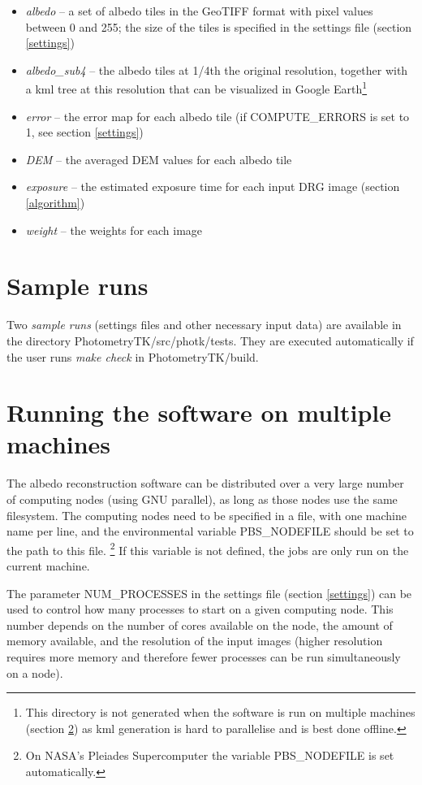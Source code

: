 \documentclass[letterpaper,fleqn,11pt]{report}
\begin{document}
\begin{itemize}
\item {\it albedo} --  a set of albedo tiles in the GeoTIFF format with pixel values between 0 and 255; the size of the tiles is specified in the settings file (section \ref{settings})
\item {\it albedo\_sub4} -- the albedo tiles at 1/4th the original resolution, together with a kml tree at this resolution that can be visualized in Google Earth\footnote{This directory is not generated when the software is run on multiple machines (section \ref{supercomp}) as kml generation is hard to parallelise and is best done offline.}
\item {\it error} --  the error map for each albedo tile (if
  COMPUTE\_ERRORS is set to 1, see section \ref{settings})
\item {\it DEM} --  the averaged DEM values for each albedo tile
\item {\it exposure} --  the estimated exposure time for each input DRG
  image (section \ref{algorithm})
\item {\it weight} --  the weights for each image
\end{itemize}

\section{Sample runs}\label{samples}

Two {\it sample runs} (settings files and other necessary input data)
are available in the directory PhotometryTK/src/photk/tests. They are executed automatically if the user
runs {\it make check} in PhotometryTK/build.


\section{Running the software on multiple machines}\label{supercomp}

The albedo reconstruction software can be distributed over a very large number of computing
nodes (using GNU parallel), as long as those nodes use the same filesystem. The
computing nodes need to be specified in a file, with one machine name
per line, and the environmental variable PBS\_NODEFILE should be set to
the path to this file. \footnote{On NASA's Pleiades Supercomputer the
variable PBS\_NODEFILE is set automatically.} If this variable is not defined, the jobs are
only run on the current machine. 
 
The parameter NUM\_PROCESSES in the settings file (section \ref{settings}) can be used
to control how many processes to start on a given computing node. This number depends
on the number of cores available on the node, the amount of memory available, and the resolution of the input images
(higher resolution requires more memory and therefore fewer processes can be run simultaneously on a node).
\end{document}
